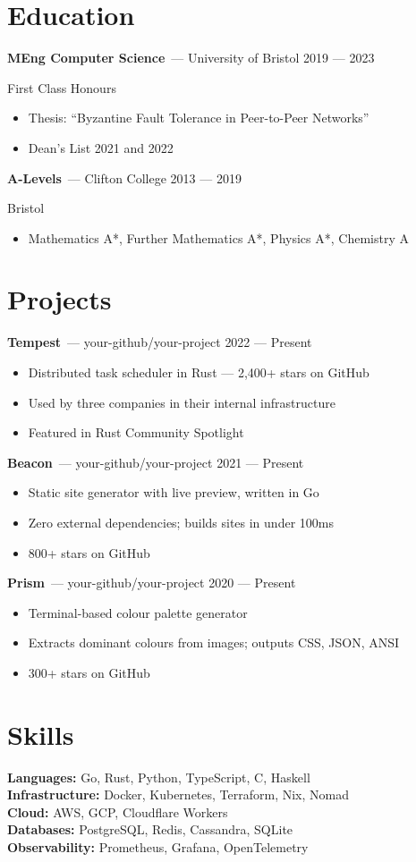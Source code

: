 \documentclass[11pt,a4paper]{article}
\newcommand{\role}[2]{%
  \noindent\textbf{#1}\ \textcolor{muted}{— #2}%
}
\newcommand{\dateright}[1]{%
  \hfill\textcolor{light}{\small #1}%
}
\newcommand{\location}[1]{%
  \par{\small\color{light} #1\par}%
}
\newcommand{\bullets}[1]{%
  \vspace{2pt}%
  \begin{itemize}[leftmargin=14pt,nosep,itemsep=2pt,topsep=2pt]%
    #1%
  \end{itemize}%
  \vspace{6pt}%
}
\begin{document}
\section*{Education}

\role{MEng Computer Science}{University of Bristol}\dateright{2019 — 2023}
\location{First Class Honours}
\bullets{
  \item Thesis: ``Byzantine Fault Tolerance in Peer-to-Peer Networks''
  \item Dean's List 2021 and 2022
}

\role{A-Levels}{Clifton College}\dateright{2013 — 2019}
\location{Bristol}
\bullets{
  \item Mathematics A*, Further Mathematics A*, Physics A*, Chemistry A
}

\section*{Projects}

\role{Tempest}{your-github/your-project}\dateright{2022 — Present}
\bullets{
  \item Distributed task scheduler in Rust — 2,400+ stars on GitHub
  \item Used by three companies in their internal infrastructure
  \item Featured in Rust Community Spotlight
}

\role{Beacon}{your-github/your-project}\dateright{2021 — Present}
\bullets{
  \item Static site generator with live preview, written in Go
  \item Zero external dependencies; builds sites in under 100ms
  \item 800+ stars on GitHub
}

\role{Prism}{your-github/your-project}\dateright{2020 — Present}
\bullets{
  \item Terminal-based colour palette generator
  \item Extracts dominant colours from images; outputs CSS, JSON, ANSI
  \item 300+ stars on GitHub
}

\section*{Skills}

\noindent
\textbf{Languages:} Go, Rust, Python, TypeScript, C, Haskell\\[2pt]
\textbf{Infrastructure:} Docker, Kubernetes, Terraform, Nix, Nomad\\[2pt]
\textbf{Cloud:} AWS, GCP, Cloudflare Workers\\[2pt]
\textbf{Databases:} PostgreSQL, Redis, Cassandra, SQLite\\[2pt]
\textbf{Observability:} Prometheus, Grafana, OpenTelemetry
\end{document}

